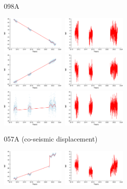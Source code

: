 \documentclass[landscape,a0paper,fontscale=0.346]{baposter} %
\begin{document}
\begin{poster}
{\begin{minipage}[c]{0.34\linewidth}
\begin{center}
098A
\end{center}
{}
  \includegraphics[height=5em]{098a_0_data.png}~\includegraphics[height=5em]{098a_0_res.png}\\
  \includegraphics[height=5em]{098a_1_data.png}~\includegraphics[height=5em]{098a_1_res.png}\\
  \includegraphics[height=5em]{098a_2_data.png}~\includegraphics[height=5em]{098a_2_res.png}
\end{minipage}
\begin{minipage}[c]{0.33\linewidth}
\begin{center}
057A (co-seismic displacement)
\end{center}
  \includegraphics[height=5em]{057a_0_data.png}~\includegraphics[height=5em]{057a_0_res.png}\\

\end{minipage}}
\end{poster}
\end{document}
